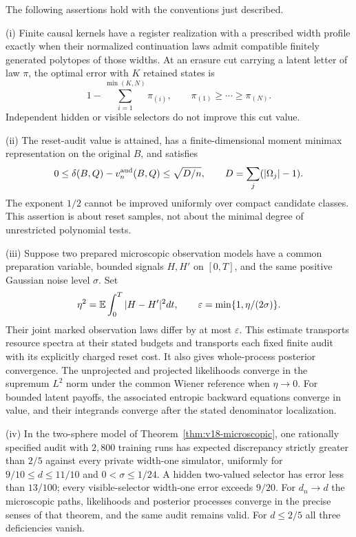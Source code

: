 \begin{theorem}
\label{thm:v18-spine}
The following assertions hold with the conventions just described.

\smallskip\noindent
\textup{(i)} Finite causal kernels have a register realization with a
prescribed width profile exactly when their normalized continuation laws
admit compatible finitely generated polytopes of those widths. At an
erasure cut carrying a latent letter of law $\pi$, the optimal error with
$K$ retained states is
\[
 1-\sum_{i=1}^{\min(K,N)}\pi_{(i)},
 \qquad \pi_{(1)}\ge\cdots\ge\pi_{(N)}.
\]
Independent hidden or visible selectors do not improve this cut value.

\smallskip\noindent
\textup{(ii)} The reset-audit value is attained, has a finite-dimensional
moment minimax representation on the original $B$, and satisfies
\[
 0\le\delta(B,Q)-v^{\rm aud}_n(B,Q)\le\sqrt{D/n},
 \qquad D=\sum_j(|\Omega_j|-1).
\]
The exponent $1/2$ cannot be improved uniformly over compact candidate
classes. This assertion is about reset samples, not about the minimal
degree of unrestricted polynomial tests.

\smallskip\noindent
\textup{(iii)} Suppose two prepared microscopic observation models have a
common preparation variable, bounded signals $H,H'$ on $[0,T]$, and the
same positive Gaussian noise level $\sigma$. Set
\[
 \eta^2=\mathbb E\int_0^T|H-H'|^2dt,\qquad
 \varepsilon=\min\{1,\eta/(2\sigma)\}.
\]
Their joint marked observation laws differ by at most $\varepsilon$.
This estimate transports resource spectra at their stated budgets and
transports each fixed finite audit with its explicitly charged reset cost.
It also gives whole-process posterior convergence. The unprojected and
projected likelihoods converge in the supremum $L^2$ norm under the common
Wiener reference when $\eta\to0$. For bounded latent payoffs, the associated
entropic backward equations converge in value, and their integrands
converge after the stated denominator localization.

\smallskip\noindent
\textup{(iv)} In the two-sphere model of
Theorem~\ref{thm:v18-microscopic}, one rationally specified audit with
$2{,}800$ training runs has expected discrepancy strictly greater than
$2/5$ against every private width-one simulator, uniformly for
$9/10\le d\le11/10$ and $0<\sigma\le1/24$. A hidden two-valued selector
has error less than $13/100$; every visible-selector width-one error exceeds
$9/20$. For $d_n\to d$ the microscopic paths, likelihoods and posterior
processes converge in the precise senses of that theorem, and the same
audit remains valid. For $d\le2/5$ all three deficiencies vanish.
\end{theorem}

